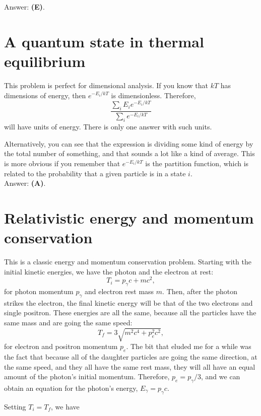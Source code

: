 \documentclass[11pt]{paper}
\newcommand{\answer}[1]{Answer: \textbf{(#1)}.}
\begin{document}
\answer{E}

\section{A quantum state in thermal equilibrium}
This problem is perfect for dimensional analysis.  If you know that $kT$ has dimensions of energy, then $e^{-E_i/kT}$ is dimensionless.  Therefore,
\begin{equation}
	\frac{\sum\limits_i E_i e^{-E_i/kT}}{\sum\limits_i e^{-E_i/kT}}
\end{equation}
will have units of energy.  There is only one answer with such units.

Alternatively, you can see that the expression is dividing some kind of energy by the total number of something, and that sounds a lot like a kind of average.  This is more obvious if you remember that $e^{-E_i/kT}$ is the partition function, which is related to the probability that a given particle is in a state $i$.\\

\answer{A}

\section{Relativistic energy and momentum conservation}
This is a classic energy and momentum conservation problem.  Starting with the initial kinetic energies, we have the photon and the electron at rest:
\begin{equation}
	T_i = p_\gamma c + mc^2,
\end{equation}
for photon momentum $p_\gamma$ and electron rest mass $m$.  Then, after the photon strikes the electron, the final kinetic energy will be that of the two electrons and single positron.  These energies are all the same, because all the particles have the same mass and are going the same speed:
\begin{equation}
	T_f = 3\sqrt{m^2c^4 + p_e^2c^2},
\end{equation}
for electron and positron momentum $p_e$.  The bit that eluded me for a while was the fact that because all of the daughter particles are going the same direction, at the same speed, and they all have the same rest mass, they will all have an equal amount of the photon's initial momentum.  Therefore, $p_e = p_\gamma/3$, and we can obtain an equation for the photon's energy, $E_\gamma = p_\gamma c$.

Setting $T_i = T_f$, we have
\end{document}
